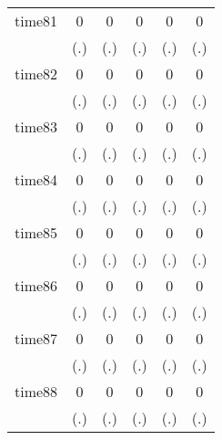\begin{table}[htbp]
\begin{tabular}{l*{5}{c}}
time81      &           0         &           0         &           0         &           0         &           0         \\
            &         (.)         &         (.)         &         (.)         &         (.)         &         (.)         \\
time82      &           0         &           0         &           0         &           0         &           0         \\
            &         (.)         &         (.)         &         (.)         &         (.)         &         (.)         \\
time83      &           0         &           0         &           0         &           0         &           0         \\
            &         (.)         &         (.)         &         (.)         &         (.)         &         (.)         \\
time84      &           0         &           0         &           0         &           0         &           0         \\
            &         (.)         &         (.)         &         (.)         &         (.)         &         (.)         \\
time85      &           0         &           0         &           0         &           0         &           0         \\
            &         (.)         &         (.)         &         (.)         &         (.)         &         (.)         \\
time86      &           0         &           0         &           0         &           0         &           0         \\
            &         (.)         &         (.)         &         (.)         &         (.)         &         (.)         \\
time87      &           0         &           0         &           0         &           0         &           0         \\
            &         (.)         &         (.)         &         (.)         &         (.)         &         (.)         \\
time88      &           0         &           0         &           0         &           0         &           0         \\
            &         (.)         &         (.)         &         (.)         &         (.)         &         (.)         \\

\end{tabular}
\end{table}
